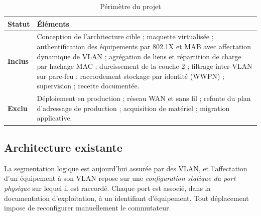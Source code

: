 \documentclass[11pt,a4paper]{article}
\begin{document}
\begin{table}[H]
\centering
\caption{Périmètre du projet}
\begin{tabularx}{\textwidth}{L{1.7cm} Y}
\toprule
{}\textbf{Statut} & \textbf{Éléments} \\
\midrule
\textbf{Inclus} & Conception de l'architecture cible ; maquette virtualisée ; authentification des équipements par 802.1X et MAB avec affectation dynamique de VLAN ; agrégation de liens et répartition de charge par hachage MAC ; durcissement de la couche 2 ; filtrage inter-VLAN sur pare-feu ; raccordement stockage par identité (WWPN) ; supervision ; recette documentée. \\
\midrule
\textbf{Exclu} & Déploiement en production ; réseau WAN et sans fil ; refonte du plan d'adressage de production ; acquisition de matériel ; migration applicative. \\
\bottomrule
\end{tabularx}
\end{table}

\subsection{Architecture existante}
La segmentation logique est aujourd'hui assurée par des VLAN, et l'affectation d'un équipement à son VLAN repose sur une \emph{configuration statique du port physique} sur lequel il est raccordé. Chaque port est associé, dans la documentation d'exploitation, à un identifiant d'équipement. Tout déplacement impose de reconfigurer manuellement le commutateur.
\end{document}
